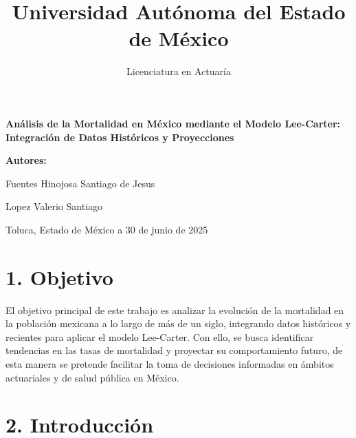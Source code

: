 \documentclass[
]{article}
\title{Universidad Autónoma del Estado de México}
\subtitle{Licenciatura en Actuaría}
\author{}
\date{\vspace{-2.5em}}
\begin{document}
\maketitle

\begin {centering}
\Huge \bfseries Análisis de la Mortalidad en México mediante el Modelo Lee-Carter: Integración de Datos Históricos y Proyecciones \par
\end {centering}
\vspace*{4cm}

\vspace{1cm}
\vspace{2cm}

\begin{centering}
\huge \bfseries 
Autores:


Fuentes Hinojosa Santiago de Jesus

Lopez Valerio Santiago \par
\end{centering}
\vspace*{2cm}

\vfill
\large  \par
\vfill

Toluca, Estado de México a 30 de junio de 2025

\clearpage
\raggedright

\clearpage

\tableofcontents
\clearpage

\justify

\hypertarget{objetivo}{%
\section{1. Objetivo}\label{objetivo}}

El objetivo principal de este trabajo es analizar la evolución de la
mortalidad en la población mexicana a lo largo de más de un siglo,
integrando datos históricos y recientes para aplicar el modelo
Lee-Carter. Con ello, se busca identificar tendencias en las tasas de
mortalidad y proyectar su comportamiento futuro, de esta manera se
pretende facilitar la toma de decisiones informadas en ámbitos
actuariales y de salud pública en México.

\hypertarget{introducciuxf3n}{%
\section{2. Introducción}\label{introducciuxf3n}}
\end{document}

